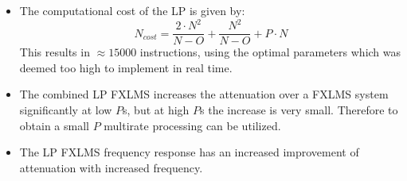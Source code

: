 \large
\begin{itemize}
\item The computational cost of the LP is given by:
	  \begin{equation}
	  N_{cost}=\frac{2\cdot N^2}{N-O}+\frac{N^2}{N-O}+P\cdot N
	  \end{equation}
	  This results in $\approx15000$ instructions, using the optimal parameters which was deemed too high to implement in real time. \\
\item The combined LP FXLMS increases the attenuation over a FXLMS system significantly at low $P$s, but at high $P$s the increase is very small. 
	  Therefore to obtain a small $P$ multirate processing can be utilized. \\ 
\item The LP FXLMS frequency response has an increased improvement of attenuation with increased frequency.

\end{itemize}

